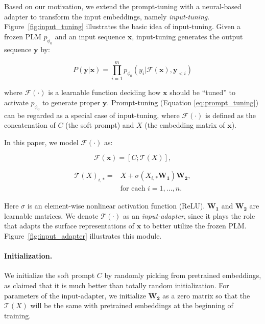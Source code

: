 Based on our motivation, we extend the prompt-tuning with a neural-based adapter to transform the input embeddings, namely \emph{input-tuning}.
Figure~\ref{fig:input_tuning} illustrates the basic idea of input-tuning. Given a frozen PLM $p_{\phi_0}$ and an input sequence $\mathbf{x}$, input-tuning generates the output sequence $\mathbf{y}$ by:

\begin{equation}
P(\mathbf{y}|\mathbf{x})=\prod_{i=1}^{m}{p_{\phi_0}(y_i|\mathcal{F}(\mathbf{x}), \mathbf{y}_{< i})}
\end{equation}

where $\mathcal{F}(\cdot)$ is a learnable function deciding how $\mathbf{x}$ should be ``tuned'' to activate $p_{\phi_0}$ to generate proper $\mathbf{y}$.
Prompt-tuning (Equation \ref{eq:prompt_tuning}) can be regarded as a special case of input-tuning, where $\mathcal{F}(\cdot)$ is defined as the concatenation of $\mathit{C}$ (the soft prompt) and $\mathit{X}$ (the embedding matrix of $\mathbf{x}$).

In this paper, we model $\mathcal{F}(\cdot)$ as:

\begin{equation}
\mathcal{F}(\mathbf{x}) = [\mathit{C}; \mathcal{T}(\mathit{X})],
\end{equation}

\begin{equation}
\begin{split}
\mathcal{T}(\mathit{X})_{i,*}=
&\mathit{X}+\sigma(\mathit{X}_{i,*}\mathbf{W_1})\mathbf{W_2}, \\
&\text{for each $i=1,...,n.$}
\end{split}
\end{equation}

Here $\sigma$ is an element-wise nonlinear activation function (ReLU).
$\mathbf{W_1}$ and $\mathbf{W_2}$ are learnable matrices. We denote $\mathcal{T}(\cdot)$ as an \emph{input-adapter}, since it plays the role that adapts the surface representations of $\mathbf{x}$ to better utilize the frozen PLM.
Figure~\ref{fig:input_adapter} illustrates this module.

\paragraph{Initialization.}

We initialize the soft prompt $\mathit{C}$ by randomly picking from pretrained embeddings, as \citet{lester2021power} claimed that it is much better than totally random initialization. For parameters of the input-adapter, we initialize $\mathbf{W_2}$ as a zero matrix so that the $\mathcal{T}(\mathit{X})$ will be the same with pretrained embeddings at the beginning of training.

